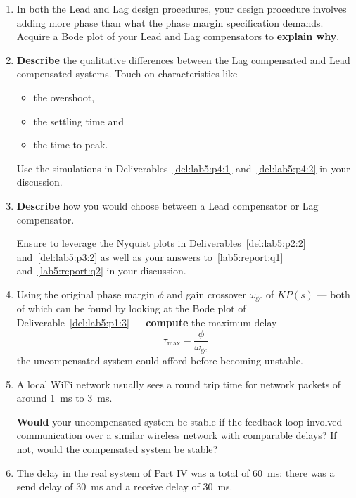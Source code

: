 \begin{deliverable}[label={lab5:report}]
  \begin{enumerate}[label={(\arabic*)}]
    \item{%
      In both the Lead and Lag design procedures, your design procedure involves adding more phase than what the phase margin specification demands.
      Acquire a Bode plot of your Lead and Lag compensators to \textbf{explain why}.
      \label{lab5:report:q1}
    }
    \item{%
      \textbf{Describe} the qualitative differences between the Lag compensated and Lead compensated systems.
      Touch on characteristics like
      \begin{itemize}
        \item{
          the overshoot,
        }
        \item{
          the settling time and
        }
        \item{
          the time to peak.
        }
      \end{itemize}
      Use the simulations in Deliverables~\ref{del:lab5:p4:1} and~\ref{del:lab5:p4:2} in your discussion.
      \label{lab5:report:q2}
    }
    \item{%
      \textbf{Describe} how you would choose between a Lead compensator or Lag compensator.

      Ensure to leverage the Nyquist plots in Deliverables~\ref{del:lab5:p2:2} and~\ref{del:lab5:p3:2} as well as your answers to~\ref{lab5:report:q1} and~\ref{lab5:report:q2} in your discussion.
      \label{lab5:report:q3}
    }
    \item{%
      Using the original phase margin \(\phi\) and gain crossover \(\omega_\mathrm{gc}\) of \(K P(s)\) --- both of which can be found by looking at the Bode plot of Deliverable~\ref{del:lab5:p1:3} --- \textbf{compute} the maximum delay
      \[
        \tau_\mathrm{max} = \frac{\phi}{\omega_\mathrm{gc}}
      \]
      the uncompensated system could afford before becoming unstable.
      \label{lab5:report:q4}
    }
    \item{%
      A local WiFi network usually sees a round trip time for network packets of around \SI{1}{\milli\second} to \SI{3}{\milli\second}.

      \textbf{Would} your uncompensated system be stable if the feedback loop involved communication over a similar wireless network with comparable delays?
      If not, would the compensated system be stable?
      \label{lab5:report:q5}
    }
    \item{%
      The delay in the real system of Part IV was a total of \SI{60}{\milli\second}:
      there was a send delay of \SI{30}{\milli\second} and a receive delay of \SI{30}{\milli\second}.

}
\end{enumerate}
\end{deliverable}
